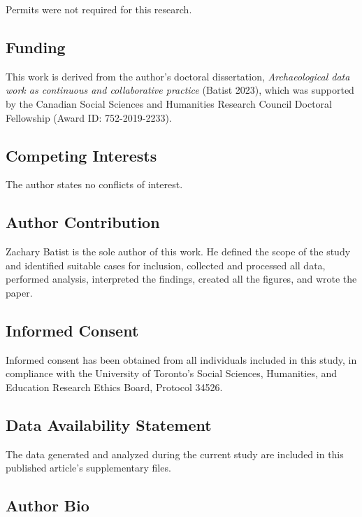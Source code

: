 \documentclass[
]{article}
\begin{document}
Permits were not required for this research.

\subsection{Funding}\label{funding}

This work is derived from the author's doctoral dissertation,
\emph{Archaeological data work as continuous and collaborative practice}
(Batist 2023), which was supported by the Canadian Social Sciences and
Humanities Research Council Doctoral Fellowship (Award ID:
752-2019-2233).

\subsection{Competing Interests}\label{competing-interests}

The author states no conflicts of interest.

\subsection{Author Contribution}\label{author-contribution}

Zachary Batist is the sole author of this work. He defined the scope of
the study and identified suitable cases for inclusion, collected and
processed all data, performed analysis, interpreted the findings,
created all the figures, and wrote the paper.

\subsection{Informed Consent}\label{informed-consent}

Informed consent has been obtained from all individuals included in this
study, in compliance with the University of Toronto's Social Sciences,
Humanities, and Education Research Ethics Board, Protocol 34526.

\subsection{Data Availability
Statement}\label{data-availability-statement}

The data generated and analyzed during the current study are included in
this published article's supplementary files.

\subsection{Author Bio}\label{author-bio}
\end{document}
